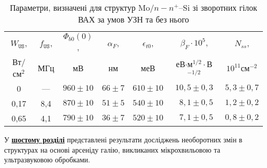 \begin{table}[hb]
\caption{Параметри, визначені для структур Mo$/n-n^+$--Si зі зворотних гілок ВАХ за умов УЗН та без нього}
\label{tabSDBParZv}
\centering
\begin{tabular}{|c|c|c|c|c|c|c|}
\hline
$W_\mathtt{US}$, &$f_\mathtt{US}$,&$\Phi_{b0}(0)$,&$\alpha_F$,&$\epsilon_{t0}$,&$\beta_F\cdot10^{5}$,&$N_{ss}$,\\
Вт/см$^2$&МГц&мВ&нм&меВ&еВ$\cdot$м$^{1/2}\cdot$В$^{-1/2}$&$10^{11}$см$^{-2}$\\\hline
0&---&$960\pm10$&$66\pm7$&$610\pm10$&$10,5\pm0,3$&$5,3\pm0,7$\\\hline
0,17&8,4&$870\pm10$&$51\pm5$&$540\pm10$&$\;\:8,1\pm0,5$&$1,2\pm0,2$\\\hline
0,65&4,1&$790\pm10$&$36\pm7$&$520\pm10$&$\;\:7,1\pm0,5$&$0,8\pm0,2$\\\hline
\end{tabular}
\end{table}

У  \underline{\textbf{шостому розділі}} представлені результати досліджень необоротних змін в структурах на основі арсеніду галію, викликаних мікрохвильовою та ультразвуковою обробками.

